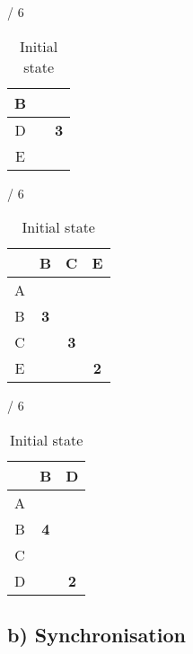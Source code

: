\documentclass[a4paper, 11 pt, article, accentcolor=tud7b]{tudreport}
\begin{document}
\begin{table}[h]
\begin{subtable}[b]{\textwidth / 6}
\begin{tabular}{| c | c | c |}
	    B &            &            \\ \hline
	    D &            & \textbf{3} \\ \hline
	    E &            &            \\ \hline
	    \end{tabular}
	    \caption{$D^{C}$}
	  \end{subtable}
    \hfill
	  \begin{subtable}[b]{\textwidth / 6}
	    \begin{tabular}{| c | c | c | c |}
	    \hline
	      & B & C & E \\ \hline
	    A &   &   &   \\ \hline
	    B & \textbf{3} &   &   \\ \hline
	    C &   & \textbf{3} &   \\ \hline
	    E &   &   & \textbf{2} \\ \hline
	    \end{tabular}
	    \caption{$D^{D}$}
	  \end{subtable}
	  \hfill
	  \begin{subtable}[b]{\textwidth / 6}
	    \begin{tabular}{| c | c | c |}
	    \hline
	      & B & D          \\ \hline
	    A &   &            \\ \hline
	    B & \textbf{4} &   \\ \hline
	    C &   &            \\ \hline
	    D &   & \textbf{2} \\ \hline
	    \end{tabular}
	    \caption{$D^{E}$}
	  \end{subtable}
	  \caption{Initial state}
	\end{table}
	
	\subsection*{b) Synchronisation}
	
\end{document}
